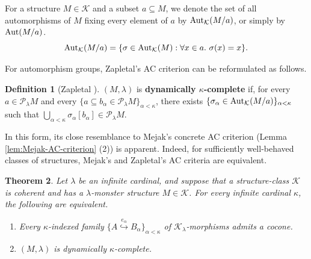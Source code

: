 \documentclass[10pt]{amsart}
\numberwithin{equation}{section}
\theoremstyle{plain}
\newtheorem{theorem}{Theorem}[section]
\theoremstyle{definition}
\newtheorem{definition}[theorem]{Definition}
\newcommand{\K}{\mathcal{K}}
\newcommand{\embed}{\hookrightarrow}
\newcommand{\embedge}[1]{\overset{#1}{\embed}}
\begin{document}
For a structure $M\in\K$ and a subset $a\subseteq M$, we denote the set of all automorphisms of $M$ fixing every element of $a$ by ${\rm Aut}_\K(M/a)$, or simply by ${\rm Aut}(M/a)$.
\[
{\rm Aut}_\K(M/a)=\{\sigma\in{\rm Aut}_\K(M):\forall x\in a.\ \sigma(x)=x\}.
\]


For automorphism groups, Zapletal's AC criterion can be reformulated as follows.

\begin{definition}[Zapletal {\cite[Definition 5.2]{Zap26}}]\label{def:Zap-dynamical-completeness}
$(M,\lambda)$ is {\bf dynamically $\kappa$-complete} if, for every $a\in \mathcal{P}_\lambda M$ and every $\{ a \subseteq b_\alpha\in \mathcal{P}_\lambda M\}_{\alpha<\kappa}$, there exists $\{\sigma_\alpha\in{\rm Aut}_\K(M/a)\}_{\alpha<\kappa}$ such that $\bigcup_{\alpha<\kappa}\sigma_\alpha[b_\alpha]\in \mathcal{P}_\lambda M$.
\end{definition}

In this form, its close resemblance to Mejak's concrete AC criterion (Lemma \ref{lem:Mejak-AC-criterion} (2)) is apparent.
Indeed, for sufficiently well-behaved classes of structures, Mejak's and Zapletal's AC criteria are equivalent.

\begin{theorem}\label{thm:dynamical-completeness}
Let $\lambda$ be an infinite cardinal, and suppose that a structure-class $\K$ is coherent and has a $\lambda$-monster structure $M\in\K$.
For every infinite cardinal $\kappa$, the following are equivalent.
\begin{enumerate}
\item Every $\kappa$-indexed family $\{A\embedge{e_\alpha}B_\alpha\}_{\alpha<\kappa}$ of $\K_\lambda$-morphisms admits a cocone.
\item $(M,\lambda)$ is dynamically $\kappa$-complete.
\end{enumerate}
\end{theorem}
\end{document}
